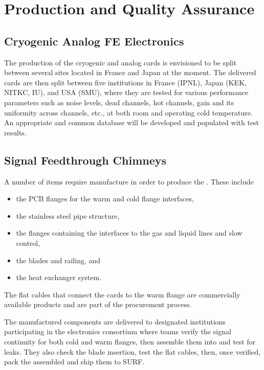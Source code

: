 \section{Production and Quality Assurance}
\label{sec:dp-tpcelec-production}

\subsection{Cryogenic Analog FE Electronics}
\label{ssec:dp-tpcelec-prod-cryofe}
The production of the cryogenic  and analog  cards is envisioned to be split between several sites located in France and Japan at the moment. The delivered cards are then split between five institutions in France (IPNL), Japan (KEK, NITKC, IU), and USA (SMU), where they are tested for various performance parameters such as noise levels, dead channels, hot channels, gain and its uniformity across channels, etc., at both room and operating cold temperature. An appropriate and common database will be developed and populated with test results. 

\subsection{Signal Feedthrough Chimneys}
\label{ssec:dp-tpcelec-prod-sft}

A number of items require manufacture in order to produce the . These include 
\begin{itemize}
\item the PCB flanges for the warm and cold \fdth flange interfaces, 
\item the stainless steel pipe structure, 
\item the flanges containing the interfaces to the gas and liquid lines and slow control, 
\item the blades and railing, and 
\item the heat exchanger system. 
\end{itemize}
The flat cables that connect the  cards to the warm flange are commercially available products and are part of the  procurement process. 

The manufactured components are delivered to designated institutions participating in the \dual electronics consortium where teams verify the signal continuity for both cold and warm flanges, then assemble them into  and test for leaks. They also check the blade insertion, test the flat cables,  then, once verified, pack the assembled   and ship them to SURF. 

